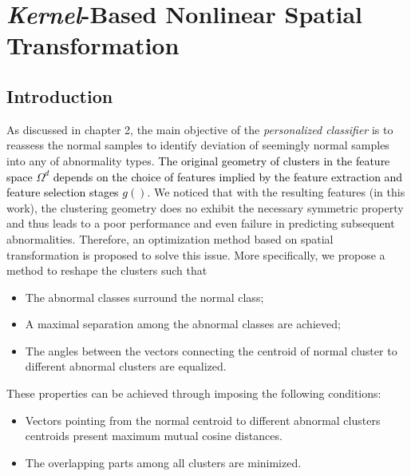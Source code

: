 \chapter{\textit{Kernel}-Based Nonlinear Spatial Transformation}\label{ch:spheremapping}
\section{Introduction}\label{sec:intro-kernel}

As discussed in chapter 2, the main objective of the \textit{personalized classifier} is to reassess the normal samples to identify deviation of seemingly normal samples into any of abnormality types. \textcolor{black}{The original geometry of clusters in the feature space $\Omega^d$ depends on the choice of features implied by the feature extraction and feature selection stages $g()$}. We noticed that with the resulting features (in this work), the clustering geometry does no exhibit the necessary symmetric property and thus leads to a poor performance and even failure in predicting subsequent abnormalities. 
Therefore, an optimization method based on spatial transformation is proposed to solve this issue. More specifically, we propose a method to reshape the clusters such that 
 \begin{itemize}
\item The abnormal classes surround the normal class; 
\item A maximal separation among the abnormal classes are achieved; 
\item The angles between the vectors connecting the centroid of normal cluster to different abnormal clusters are equalized. 
\end{itemize}

These properties can be achieved through imposing the following conditions:  
 \begin{itemize}
     \item Vectors pointing from the normal centroid to different abnormal clusters centroids present maximum mutual cosine distances.
     \item The overlapping parts among all clusters are minimized.
 \end{itemize}



